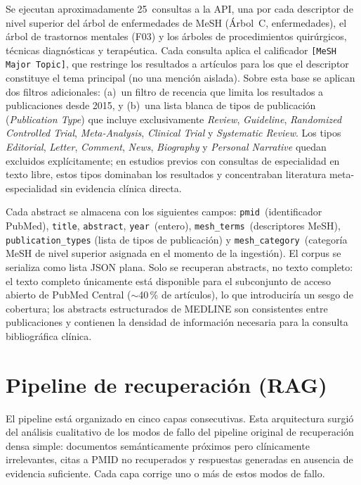 \documentclass[11pt,a4paper,spanish]{book}
\numberwithin{equation}{chapter}
\numberwithin{figure}{chapter}
\begin{document}
Se ejecutan aproximadamente 25~consultas a la API, una por cada descriptor de nivel superior del árbol de enfermedades de MeSH (Árbol~C, enfermedades), el árbol de trastornos mentales (F03) y los árboles de procedimientos quirúrgicos, técnicas diagnósticas y terapéutica. Cada consulta aplica el calificador \texttt{[MeSH Major Topic]}, que restringe los resultados a artículos para los que el descriptor constituye el tema principal (no una mención aislada). Sobre esta base se aplican dos filtros adicionales: (a)~un filtro de recencia que limita los resultados a publicaciones desde 2015, y (b)~una lista blanca de tipos de publicación (\textit{Publication Type}) que incluye exclusivamente \textit{Review}, \textit{Guideline}, \textit{Randomized Controlled Trial}, \textit{Meta-Analysis}, \textit{Clinical Trial} y \textit{Systematic Review}. Los tipos \textit{Editorial}, \textit{Letter}, \textit{Comment}, \textit{News}, \textit{Biography} y \textit{Personal Narrative} quedan excluidos explícitamente; en estudios previos con consultas de especialidad en texto libre, estos tipos dominaban los resultados y concentraban literatura meta-especialidad sin evidencia clínica directa.

Cada abstract se almacena con los siguientes campos: \texttt{pmid}~(identificador PubMed), \texttt{title}, \texttt{abstract}, \texttt{year}~(entero), \texttt{mesh\_terms}~(descriptores MeSH), \texttt{publication\_types} (lista de tipos de publicación) y \texttt{mesh\_category}~(categoría MeSH de nivel superior asignada en el momento de la ingestión). El corpus se serializa como lista JSON plana. Solo se recuperan abstracts, no texto completo: el texto completo únicamente está disponible para el subconjunto de acceso abierto de PubMed Central ($\sim$40\,\% de artículos), lo que introduciría un sesgo de cobertura; los abstracts estructurados de MEDLINE son consistentes entre publicaciones y contienen la densidad de información necesaria para la consulta bibliográfica clínica.

\section{Pipeline de recuperación (RAG)}
\label{sec:c5_rag}

El pipeline está organizado en cinco capas consecutivas. Esta arquitectura surgió del análisis cualitativo de los modos de fallo del pipeline original de recuperación densa simple: documentos semánticamente próximos pero clínicamente irrelevantes, citas a PMID no recuperados y respuestas generadas en ausencia de evidencia suficiente. Cada capa corrige uno o más de estos modos de fallo.
\end{document}
